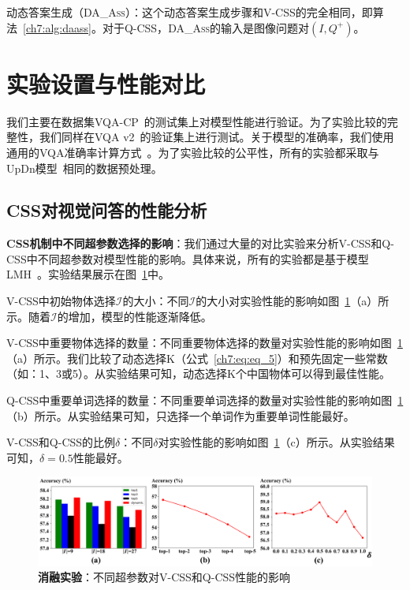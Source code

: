 动态答案生成（\textsc{DA\_Ass}）：这个动态答案生成步骤和V-CSS的完全相同，即算法~\ref{ch7:alg:daass}。对于Q-CSS，\textsc{DA\_Ass}的输入是图像问题对$(I, Q^+)$。


\section{实验设置与性能对比}

我们主要在数据集VQA-CP~\cite{agrawal2018don}的测试集上对模型性能进行验证。为了实验比较的完整性，我们同样在VQA v2~\cite{goyal2017making}的验证集上进行测试。关于模型的准确率，我们使用通用的VQA准确率计算方式~\cite{antol2015vqa}。为了实验比较的公平性，所有的实验都采取与UpDn模型~\cite{anderson2018bottom}相同的数据预处理。

\subsection{CSS对视觉问答的性能分析}

\textbf{CSS机制中不同超参数选择的影响}：我们通过大量的对比实验来分析V-CSS和Q-CSS中不同超参数对模型性能的影响。具体来说，所有的实验都是基于模型LMH~\cite{clark2019don}。实验结果展示在图~\ref{ch7:fig:ablative_studies}中。

V-CSS中初始物体选择$\mathcal{I}$的大小：不同$\mathcal{I}$的大小对实验性能的影响如图~\ref{ch7:fig:ablative_studies}（a）所示。随着$\mathcal{I}$的增加，模型的性能逐渐降低。

V-CSS中重要物体选择的数量：不同重要物体选择的数量对实验性能的影响如图~\ref{ch7:fig:ablative_studies}（a）所示。我们比较了动态选择K（公式~\ref{ch7:eq:eq_5}）和预先固定一些常数（如：1、3或5）。从实验结果可知，动态选择K个中国物体可以得到最佳性能。

Q-CSS中重要单词选择的数量：不同重要单词选择的数量对实验性能的影响如图~\ref{ch7:fig:ablative_studies}（b）所示。从实验结果可知，只选择一个单词作为重要单词性能最好。

V-CSS和Q-CSS的比例$\delta$：不同$\delta$对实验性能的影响如图~\ref{ch7:fig:ablative_studies}（c）所示。从实验结果可知，$\delta = 0.5$性能最好。


\begin{figure}[t]
    \centering
    \includegraphics[width=\linewidth]{chapter7/res/ablative_studies.pdf}
    \caption{\textbf{消融实验}：不同超参数对V-CSS和Q-CSS性能的影响}
    \label{ch7:fig:ablative_studies}
\end{figure}


